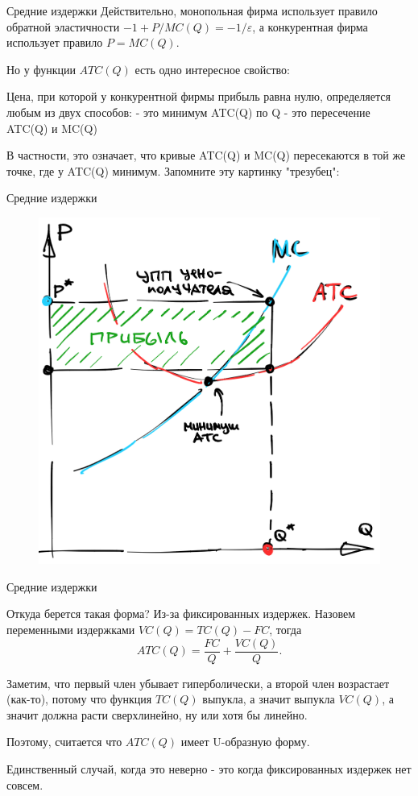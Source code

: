 \documentclass{beamer}
\begin{document}
\begin{frame}{Средние издержки}
Действительно, монопольная фирма использует правило обратной эластичности $-1 + P/MC(Q) = -1/\varepsilon$, а конкурентная фирма использует правило $P = MC(Q)$. 

Но у функции $ATC(Q)$ есть одно интересное свойство:

\begin{lemma}
Цена, при которой у конкурентной фирмы прибыль равна нулю, определяется любым из двух способов:
- это минимум ATC(Q) по Q
- это пересечение ATC(Q) и MC(Q)
\end{lemma}
В частности, это означает, что кривые ATC(Q) и MC(Q) пересекаются в той же точке, где у ATC(Q) минимум. Запомните эту картинку "трезубец":
\end{frame}

\begin{frame}{Средние издержки}
\begin{figure}[hbt]
\centering
\includegraphics[width=.7 \textwidth]{trident.png}
\end{figure}
\end{frame}

\begin{frame}{Средние издержки}

Откуда берется такая форма? Из-за фиксированных издержек. Назовем переменными издержками $VC(Q) = TC(Q) - FC$, тогда
$$ ATC(Q) = \frac{FC}{Q} + \frac{VC(Q)}{Q}.$$

Заметим, что первый член убывает гиперболически, а второй член возрастает (как-то), потому что функция $TC(Q)$ выпукла, а значит выпукла $VC(Q)$, а значит должна расти сверхлинейно, ну или хотя бы линейно.

Поэтому, считается что $ATC(Q)$ имеет U-образную форму. 

Единственный случай, когда это неверно - это когда фиксированных издержек нет совсем.

\end{frame}
\end{document}
